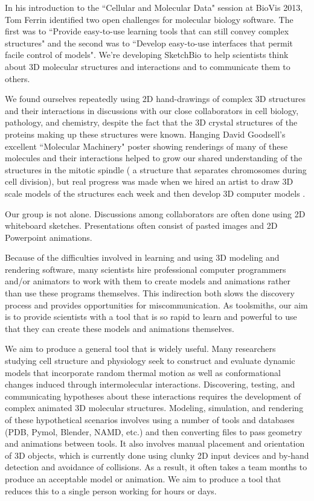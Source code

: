 \documentclass[twocolumn]{bmcart}%
\begin{document}
In his introduction to the ``Cellular and Molecular Data" session at BioVis 2013, Tom Ferrin identified two open challenges for molecular biology software.
The first was to ``Provide easy-to-use learning tools that can still convey complex structures" and the second was to ``Develop easy-to-use interfaces that permit facile control of models".
We’re developing SketchBio to help scientists think about 3D molecular structures and interactions and to communicate them to others.

We found ourselves repeatedly using 2D hand-drawings of complex 3D structures and their interactions in discussions with our close collaborators in cell biology, pathology, and chemistry, despite the fact that the 3D crystal structures of the proteins making up these structures were known.
Hanging David Goodsell's excellent ``Molecular Machinery" poster \cite{Goodsell} showing renderings of many of these molecules and their interactions helped to grow our shared understanding of the structures in the mitotic spindle ( a structure that separates chromosomes during cell division), but real progress was made when we hired an artist to draw 3D scale models of the structures each week and then develop 3D computer models \cite{taylor2012}.

Our group is not alone.  Discussions among collaborators are often done using 2D whiteboard sketches.  Presentations often consist of pasted images and 2D Powerpoint animations.

Because of the difficulties involved in learning and using 3D modeling and rendering software, many scientists hire professional computer programmers and/or animators to work with them to create models and animations rather than use these programs themselves.
This indirection both slows the discovery process and provides opportunities for miscommunication.
As toolsmiths, our aim is to provide scientists with a tool that is so rapid to learn and powerful to use that they can create these models and animations themselves.

We aim to produce a general tool that is widely useful.  Many researchers studying cell structure and physiology seek to construct and evaluate dynamic models that incorporate random thermal motion as well as conformational changes induced through intermolecular interactions.
Discovering, testing, and communicating hypotheses about these interactions requires the development of complex animated 3D molecular structures. Modeling, simulation, and rendering of these hypothetical scenarios involves using a number of tools and databases (PDB, Pymol, Blender, NAMD, etc.) and then converting files to pass geometry and animations between tools. It also involves manual placement and orientation of 3D objects, which is currently done using clunky 2D input devices and by-hand detection and avoidance of collisions. As a result, it often takes a team months to produce an acceptable model or animation.
We aim to produce a tool that reduces this to a single person working for hours or days.
\end{document}
